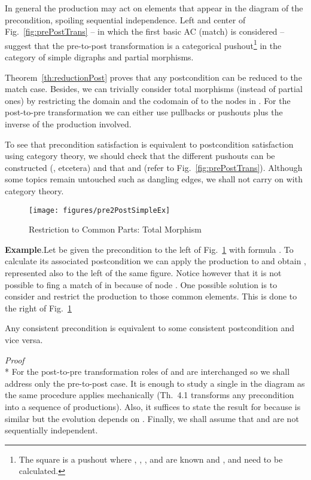 \documentclass{fundam}
\newcommand{\proofend}{\hfill}
\begin{document}
In general the production may act on elements that appear in the
diagram of the precondition, spoiling sequential independence. Left
and center of Fig.~\ref{fig:prePostTrans} -- in which the first basic
AC (match) is considered -- suggest that the pre-to-post
transformation is a categorical pushout\footnote{The square 
  is a pushout where , , ,  and
   are known and
  ,  and  need to be calculated.}
in the category of simple digraphs and partial morphisms.

Theorem~\ref{th:reductionPost} proves that any postcondition can be
reduced to the match case. Besides, we can trivially consider total
morphisms (instead of partial ones) by restricting the domain and the
codomain of  to the nodes in . For the
post-to-pre transformation we can either use pullbacks or pushouts
plus the inverse of the production involved.

To see that precondition satisfaction is equivalent to postcondition
satisfaction using category theory, we should check that the different
pushouts can be constructed (, etcetera) and that
 and  (refer to
Fig.~\ref{fig:prePostTrans}). Although some topics remain untouched
such as dangling edges, we shall not carry on with category theory.

\begin{figure}[htbp]
  \centering
  \texttt{[image: figures/pre2PostSimpleEx]}
  \caption{Restriction to Common Parts: Total Morphism}
  \label{fig:pre2PostSimpleEx}
\end{figure}

\noindent \textbf{Example}.Let be given the precondition
 to the left of
Fig.~\ref{fig:pre2PostSimpleEx} with formula
. To calculate its
associated postcondition we can apply the production to
 and obtain ,
represented also to the left of the same figure. Notice however that
it is not possible to fing a match of  in
 because of node . One possible solution
is to consider  and restrict
the production to those common elements. This is done to the right of
Fig.~\ref{fig:pre2PostSimpleEx} \proofend

\begin{theorem}
  \label{th:prePostPre}
  Any consistent precondition is equivalent to some consistent
  postcondition and vice versa.
\end{theorem}

\noindent \emph{Proof} \\*
For the post-to-pre transformation roles of  and 
are interchanged so we shall address only the pre-to-post case. It is
enough to study a single  in the diagram as the same procedure
applies mechanically (Th.~4.1 transforms any precondition into a
sequence of productions). Also, it suffices to state the result for
 because  is similar but the evolution depends
on . Finally, we shall assume that  and  are not
sequentially independent.
\end{document}
